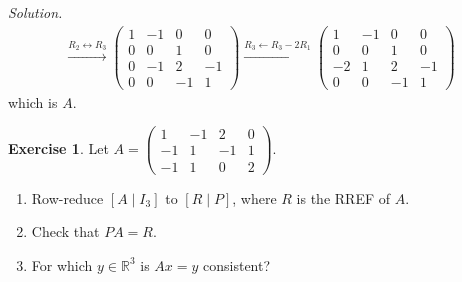 \documentclass[12pt]{article}
\newcommand{\R}{\mathbb R}
\theoremstyle{definition}
\newtheorem{exercise}{Exercise}
\newenvironment{solution}{\par\noindent\textit{Solution.}\ }{\par\smallskip}
\begin{document}
\begin{solution}
\[\begin{gathered}
\xrightarrow{R_2\leftrightarrow R_3}
\begin{pmatrix}1&-1&0&0\\0&0&1&0\\0&-1&2&-1\\0&0&-1&1\end{pmatrix}
\xrightarrow{R_3\leftarrow R_3-2R_1}
\begin{pmatrix}1&-1&0&0\\0&0&1&0\\-2&1&2&-1\\0&0&-1&1\end{pmatrix}
\end{gathered}
\]
which is \(A\).
\end{solution}

\begin{exercise}\label{r2-dr-row-equivalent}
Let \(A=\begin{pmatrix}1&-1&2&0\\-1&1&-1&1\\-1&1&0&2\end{pmatrix}\).
\begin{enumerate}
\item Row-reduce \([A\mid I_3]\) to \([R\mid P]\), where \(R\) is the RREF of \(A\).
\item Check that \(PA=R\).
\item For which \(y\in\R^3\) is \(Ax=y\) consistent?
\end{enumerate}
\end{exercise}
\end{document}
